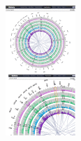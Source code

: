 \documentclass{beamer}              %
\begin{document}
\begin{frame}
\begin{columns}[T]
\begin{column}{.28\textwidth}
		\includegraphics[width=\textwidth,right]{figures/101p_06.png}
    \end{column}
  \end{columns}
\end{frame}
\end{document}
